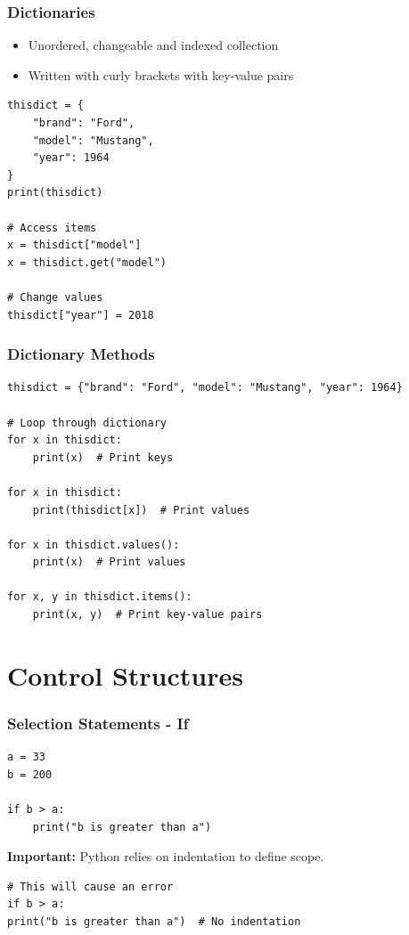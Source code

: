 \documentclass[aspectratio=169]{beamer}
\begin{document}
\begin{frame}[fragile]
\frametitle{Dictionaries}
\begin{itemize}
\item Unordered, changeable and indexed collection
\item Written with curly brackets with key-value pairs
\end{itemize}

\begin{lstlisting}
thisdict = {
    "brand": "Ford",
    "model": "Mustang",
    "year": 1964
}
print(thisdict)

# Access items
x = thisdict["model"]
x = thisdict.get("model")

# Change values
thisdict["year"] = 2018
\end{lstlisting}
\end{frame}

\begin{frame}[fragile]
\frametitle{Dictionary Methods}
\begin{lstlisting}
thisdict = {"brand": "Ford", "model": "Mustang", "year": 1964}

# Loop through dictionary
for x in thisdict:
    print(x)  # Print keys

for x in thisdict:
    print(thisdict[x])  # Print values

for x in thisdict.values():
    print(x)  # Print values

for x, y in thisdict.items():
    print(x, y)  # Print key-value pairs
\end{lstlisting}
\end{frame}

\section{Control Structures}

\begin{frame}[fragile]
\frametitle{Selection Statements - If}
\begin{lstlisting}
a = 33
b = 200

if b > a:
    print("b is greater than a")
\end{lstlisting}

\textbf{Important:} Python relies on indentation to define scope.

\begin{lstlisting}
# This will cause an error
if b > a:
print("b is greater than a")  # No indentation
\end{lstlisting}
\end{frame}
\end{document}
